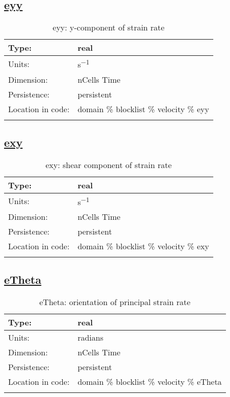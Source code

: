 \subsection[eyy]{\hyperref[sec:var_tab_velocity]{eyy}}
\label{subsec:var_sec_velocity_eyy}
\begin{center}
\begin{longtable}{| p{2.0in} | p{4.0in} |}
        \hline 
        Type: & real \\
        \hline 
        Units: & \si{s^{-1}} \\
        \hline 
        Dimension: & nCells Time \\
        \hline 
        Persistence: & persistent \\
        \hline 
         Location in code: & domain \% blocklist \% velocity \% eyy \\
         \hline 
    \caption{eyy: y-component of strain rate}
\end{longtable}
\end{center}
\subsection[exy]{\hyperref[sec:var_tab_velocity]{exy}}
\label{subsec:var_sec_velocity_exy}
\begin{center}
\begin{longtable}{| p{2.0in} | p{4.0in} |}
        \hline 
        Type: & real \\
        \hline 
        Units: & \si{s^{-1}} \\
        \hline 
        Dimension: & nCells Time \\
        \hline 
        Persistence: & persistent \\
        \hline 
         Location in code: & domain \% blocklist \% velocity \% exy \\
         \hline 
    \caption{exy: shear component of strain rate}
\end{longtable}
\end{center}
\subsection[eTheta]{\hyperref[sec:var_tab_velocity]{eTheta}}
\label{subsec:var_sec_velocity_eTheta}
\begin{center}
\begin{longtable}{| p{2.0in} | p{4.0in} |}
        \hline 
        Type: & real \\
        \hline 
        Units: & \si{radians} \\
        \hline 
        Dimension: & nCells Time \\
        \hline 
        Persistence: & persistent \\
        \hline 
         Location in code: & domain \% blocklist \% velocity \% eTheta \\
         \hline 
    \caption{eTheta: orientation of principal strain rate}
\end{longtable}
\end{center}
